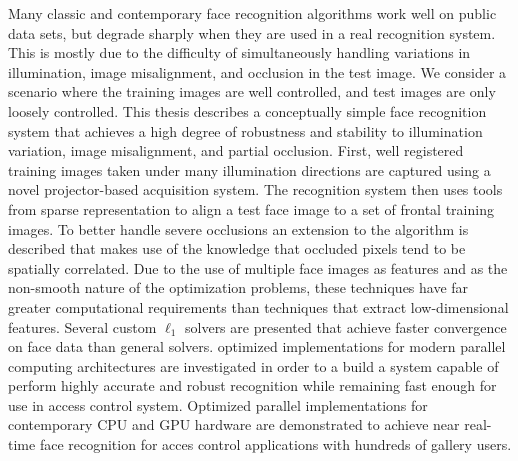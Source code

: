 Many classic and contemporary face recognition algorithms work well on public
data sets, but degrade sharply when they are used in a real recognition system.
This is mostly due to the difficulty of simultaneously handling variations in
illumination, image misalignment, and occlusion in the test image. We consider
a scenario where the training images are well controlled, and test images are
only loosely controlled.  This thesis describes a conceptually simple face
recognition system that achieves a high degree of robustness and stability to
illumination variation, image misalignment, and partial occlusion.  First, well
registered training images taken under many illumination directions are
captured using a novel projector-based acquisition system.  The recognition
system then uses tools from sparse representation to align a test face image to
a set of frontal training images.  To better handle severe occlusions an
extension to the algorithm is described that makes use of the knowledge that
occluded pixels tend to be spatially correlated.  Due to the use of multiple
face images as features and as the non-smooth nature of the optimization
problems, these techniques have far greater computational requirements than
techniques that extract low-dimensional features.  Several custom $\ell_1$
solvers are presented that achieve faster convergence on face data than general
solvers.  optimized implementations for modern parallel computing architectures
are investigated in order to a build a system capable of perform highly
accurate and robust recognition while remaining fast enough for use in access
control system.  Optimized parallel implementations for contemporary CPU and
GPU hardware are demonstrated to achieve near real-time face recognition for
acces control applications with hundreds of gallery users.



